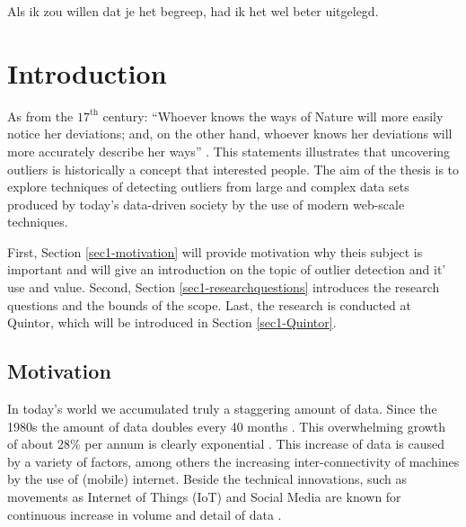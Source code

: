 \begin{savequote}[78mm] 
Als ik zou willen dat je het begreep, had ik het wel beter uitgelegd.  
\end{savequote}

\chapter{Introduction}

As from the $17^{\text{th}}$ century: ``Whoever knows the ways of Nature will more easily notice her deviations; and, on the other hand, whoever knows her deviations will more accurately describe her ways'' \cite{bacon2010novum}. This statements illustrates that uncovering outliers is historically a concept that interested people. The aim of the thesis is to explore techniques of detecting outliers from large and complex data sets produced by today's data-driven society by the use of modern web-scale techniques.

First, Section \ref{sec1-motivation} will provide motivation why theis subject is important and will give an introduction on the topic of outlier detection and it' use and value. Second, Section \ref{sec1-researchquestions} introduces the research questions and the bounds of the scope. Last, the research is conducted at Quintor, which will be introduced in Section \ref{sec1-Quintor}. 

\section{Motivation \label{sec1-motivation}}
In today's world we accumulated truly a staggering amount of data. Since the 1980s the amount of data doubles every 40 months \cite{Hilbert01042011}. This overwhelming growth of about 28\% per annum is clearly exponential \cite{6479953}. This increase of data is caused by a variety of factors, among others the increasing inter-connectivity of machines by the use of (mobile) internet. Beside the technical innovations, such as movements as Internet of Things (IoT) and Social Media are known for continuous increase in volume and detail of data \cite{holler2014from}. 

